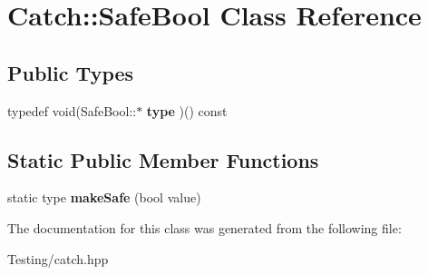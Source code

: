 \hypertarget{class_catch_1_1_safe_bool}{\section{Catch\-:\-:Safe\-Bool Class Reference}
\label{class_catch_1_1_safe_bool}
}
\subsection*{Public Types}
\begin{DoxyCompactItemize}
\item 
\hypertarget{class_catch_1_1_safe_bool_a14cd49eced5b255a1f59512d3b9395ae}{typedef void(Safe\-Bool\-::$\ast$ {\bfseries type} )() const }\label{class_catch_1_1_safe_bool_a14cd49eced5b255a1f59512d3b9395ae}

\end{DoxyCompactItemize}
\subsection*{Static Public Member Functions}
\begin{DoxyCompactItemize}
\item 
\hypertarget{class_catch_1_1_safe_bool_af0ea63d9820f8bf7a8b76377913c4e77}{static type {\bfseries make\-Safe} (bool value)}\label{class_catch_1_1_safe_bool_af0ea63d9820f8bf7a8b76377913c4e77}

\end{DoxyCompactItemize}


The documentation for this class was generated from the following file\-:\begin{DoxyCompactItemize}
\item 
Testing/catch.\-hpp\end{DoxyCompactItemize}
